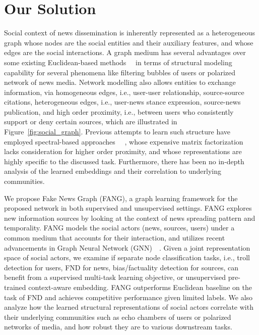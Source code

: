 \documentclass[fyp]{socreport}
\theoremstyle{definition}
\theoremstyle{hypothesis}
\begin{document}
\section{Our Solution}
Social context of news dissemination is inherently represented as a heterogeneous graph whose nodes are the social entities and their auxiliary features, and whose edges are the social interactions. A graph medium has several advantages over some existing Euclidean-based methods~\cite{ruchansky2017csi}~\cite{liu2018early} in terms of structural modeling capability for several phenomena like filtering bubbles of users or polarized network of news media. Network modelling also allows entities to exchange information, via homogeneous edges, i.e., user-user relationship, source-source citations, heterogeneous edges, i.e., user-news stance expression, source-news publication, and high order proximity, i.e., between users who consistently support or deny certain sources, which are illustrated in  
Figure~\ref{fig:social_graph}.  
Previous attempts to learn such structure have employed spectral-based approaches ~\cite{shu2019beyond}~\cite{gupta2012evaluating}, whose expensive matrix factorization lacks consideration for higher order proximity, and whose representations are highly specific to the discussed task. Furthermore, there has been no in-depth analysis of the learned embeddings and their correlation to underlying communities.

We propose Fake News Graph (FANG), a graph learning framework for the proposed network in both supervised and unsupervised settings. FANG explores new information sources by looking at the context of news spreading pattern and temporality. FANG models the social actors (news, sources, users) under a common medium that accounts for their interaction, and utilizes recent advancements in Graph Neural Network (GNN)~\cite{kipf2016semi}~\cite{grover2016node2vec}. Given a joint representation space of social actors, we examine if separate node classification tasks, i.e., troll detection for users, FND for news, bias/factuality detection for sources, can benefit from a supervised multi-task learning objective, or unsupervised pre-trained context-aware embedding. FANG outperforms Euclidean baseline on the task of FND and achieves competitive performance given limited labels. We also analyze how the learned structural representations of social actors correlate with their underlying communities such as echo chambers of users or polarized networks of media, and how robust they are to various downstream tasks.
\end{document}

